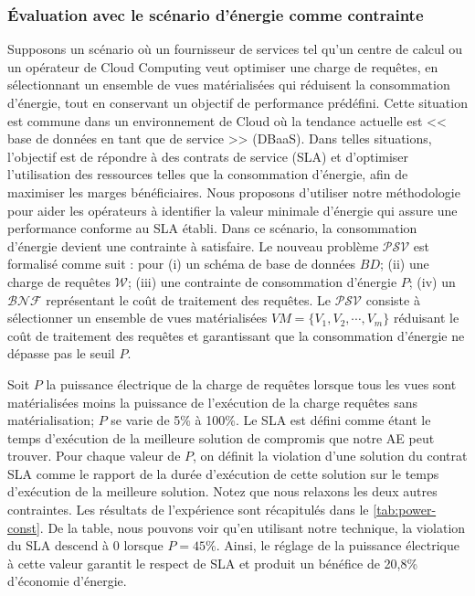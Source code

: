 \subsubsection{Évaluation avec le scénario d'énergie comme contrainte}\label{subsubsec:ImpactPower}
Supposons un scénario où un fournisseur de services tel qu'un centre de calcul ou un opérateur de Cloud Computing veut optimiser une charge de requêtes, en sélectionnant un ensemble de vues matérialisées qui réduisent la consommation d'énergie, tout en conservant un objectif de performance prédéfini. Cette situation est commune dans un environnement de Cloud où la tendance actuelle est << base de données en tant que de service >> (\gls{DBaaS}). Dans telles situations, l'objectif est de répondre à des contrats de service (\gls{SLA}) et d'optimiser l'utilisation des ressources telles que la consommation d'énergie, afin de maximiser les marges bénéficiaires. Nous proposons d'utiliser notre méthodologie pour aider les opérateurs à identifier la valeur minimale d'énergie qui assure une performance conforme au SLA établi. Dans ce scénario, la consommation d'énergie devient une contrainte à satisfaire. Le nouveau problème $\mathcal{PSV}$ est formalisé comme suit : pour (i) un schéma de base de données $BD$; (ii) une charge de requêtes $\mathcal{W}$; (iii) une contrainte de consommation d'énergie $P$; (iv) un $\mathcal{BNF}$ représentant le coût de traitement des requêtes. Le $\mathcal{PSV}$ consiste à sélectionner un ensemble de vues matérialisées $VM = \{V_1, V_2, \cdots, V_m\}$ réduisant le coût de traitement des requêtes et garantissant que la consommation d'énergie ne dépasse pas le seuil $P$.

Soit $P$ la puissance électrique de la charge de requêtes lorsque tous les vues sont matérialisées moins la puissance de l'exécution de la charge requêtes sans matérialisation; $P$ se varie de 5\% à 100\%. Le SLA est défini comme étant le temps d'exécution de la meilleure solution de compromis que notre AE peut trouver. Pour chaque valeur de $P$, on définit la violation d'une solution du contrat SLA comme le rapport de la durée d'exécution de cette solution sur le temps d'exécution de la meilleure solution. Notez que nous relaxons les deux autres contraintes. Les résultats de l'expérience sont récapitulés dans le \ref{tab:power-const}. De la table, nous pouvons voir qu'en utilisant notre technique, la violation du SLA descend à 0 lorsque $P = 45\%$. Ainsi, le réglage de la puissance électrique à cette valeur garantit le respect de SLA et produit un bénéfice de 20,8\% d'économie d'énergie.

